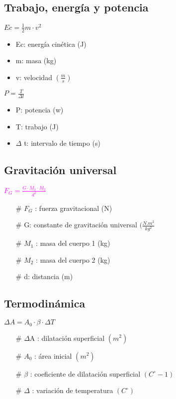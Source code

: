 \documentclass[a4peper, 12pt]{article}
\begin{document}
\subsection{Trabajo, energía y potencia}

$Ec=\frac{1}{2} m\cdot v^2$
\begin{itemize}
    \item Ec: energía cinética (J)
    \item m: masa (kg)
    \item v: velocidad $(\frac{m}{s})$
\end{itemize}

$P= \frac{T}{\Delta t}$
\begin{itemize}
    \item P: potencia (w)
    \item T: trabajo (J)
    \item $\Delta$ t: intervalo de tiempo (s)
\end{itemize}

\subsection{Gravitación universal}

\textcolor{magenta}{$F_{G}= \frac{G \cdot M_{1} \cdot M_{2}}{d^2}$}
\begin{itemize}
    \item[\#] $F_{G}$ : fuerza gravitacional (N)
    \item[\#] G: constante de gravitación universal $(\frac{N.m^2}{kg^2}$
    \item[\#] $M_{1}$ : masa del cuerpo 1 (kg)
    \item[\#] $M_{2}$ : masa del cuerpo 2 (kg)
    \item[\#] d: distancia (m)
\end{itemize}

\subsection{Termodinámica}

$\Delta A= A_{0} \cdot \beta \cdot \Delta T$

\begin{itemize}
    \item[\#] $\Delta$A : dilatación superficial $(m^2)$
    \item[\#] $A_{0}$ : área inicial $(m^2)$
    \item[\#] $\beta$ : coeficiente de dilatación superficial $(C ^\circ -1)$
    \item[\#] $\Delta$ : variación de temperatura  $(C ^\circ )$ 
\end{itemize}
\end{document}
